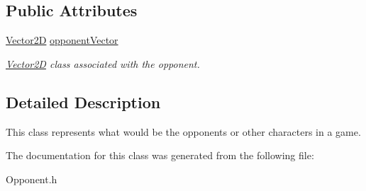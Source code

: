 \subsection*{Public Attributes}
\begin{DoxyCompactItemize}
\item 
\mbox{\label{class_opponent_a42f17fb8f71af0b11fb20b900adf4f43}} 
\mbox{\hyperlink{struct_vector2_d}{Vector2D}} \mbox{\hyperlink{class_opponent_a42f17fb8f71af0b11fb20b900adf4f43}{opponent\+Vector}}
\begin{DoxyCompactList}\small\item\em \mbox{\hyperlink{struct_vector2_d}{Vector2D}} class associated with the opponent. \end{DoxyCompactList}\end{DoxyCompactItemize}


\subsection{Detailed Description}
This class represents what would be the opponents or other characters in a game. 

The documentation for this class was generated from the following file\+:\begin{DoxyCompactItemize}
\item 
Opponent.\+h\end{DoxyCompactItemize}
